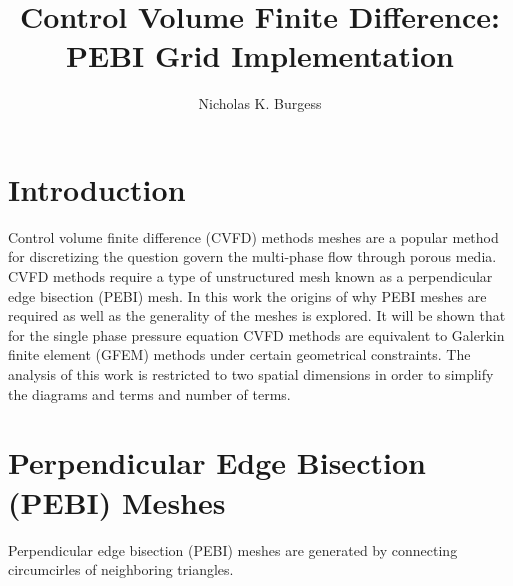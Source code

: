 \documentclass[letterpaper]{article}
\title{Control Volume Finite Difference: PEBI Grid Implementation}
\author{Nicholas K. Burgess}
\begin{document}
\maketitle
\section{Introduction}
Control volume finite difference (CVFD) methods meshes are a popular method for discretizing the question govern the multi-phase flow through porous media.  CVFD methods require a type of unstructured mesh known as a perpendicular edge bisection (PEBI) mesh.  In this work the origins of why PEBI meshes are required as well as the generality of the meshes is explored.  It will be shown that for the single phase pressure equation CVFD methods are equivalent to Galerkin finite element (GFEM) methods under certain geometrical constraints.  The analysis of this work is restricted to two spatial dimensions in order to simplify the diagrams and terms and number of terms.    
\section{Perpendicular Edge Bisection (PEBI) Meshes}
Perpendicular edge bisection (PEBI) meshes are generated by connecting circumcirles of neighboring triangles.  
\end{document}

